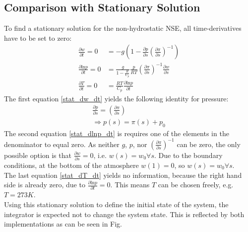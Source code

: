 \subsection{Comparison with Stationary Solution}
To find a stationary solution for the non-hydrostatic NSE, all time-derivatives have to be set to zero:
\begin{align}
\frac{\partial w}{\partial t} =0&= -g\left(1 - \frac{\partial p}{\partial s}\left(\frac{\partial \pi}{\partial s}\right)^{-1}\right)\label{stat_dw_dt} \\
\frac{\partial \text{ln}p}{\partial t}=0 &= \frac{g}{1- \frac{R}{C_p}} \frac{p}{RT}\left(\frac{\partial \pi}{\partial s}\right)^{-1} \frac{\partial w}{\partial s}\label{stat_dlnp_dt}\\
\frac{\partial T}{\partial t} =0&= \frac{RT}{C_p}\frac{\partial \text{ln}p}{\partial t}\label{stat_dT_dt}
\end{align}
The first equation \ref{stat_dw_dt} yields the following identity for pressure:
\begin{align*}
\frac{\partial p}{\partial s}=\left(\frac{\partial \pi}{\partial s}\right)\\
\Rightarrow p(s)=\pi (s) + p_0
\end{align*}
The second equation \ref{stat_dlnp_dt} is requires one of the elements in the denominator to equal zero.
As neither $g$, $p$, nor $\left(\frac{\partial \pi}{\partial s}\right)^{-1}$ can be zero, the only possible option is that $\frac{\partial w}{\partial s}=0$, i.e. $w(s)=w_0 \forall s$.
Due to the boundary conditions, at the bottom of the atmosphere $w(1)=0$, so $w(s)=w_0 \forall s$.\\
The last equation \ref{stat_dT_dt} yields no information, because the right hand side is already zero, due to $\frac{\partial \text{ln}p}{\partial t}=0$.
This means $T$ can be chosen freely, e.g. $T=273K$.\\
Using this stationary solution to define the initial state of the system, the integrator is expected not to change the system state.
This is reflected by both implementations as can be seen in Fig. 

